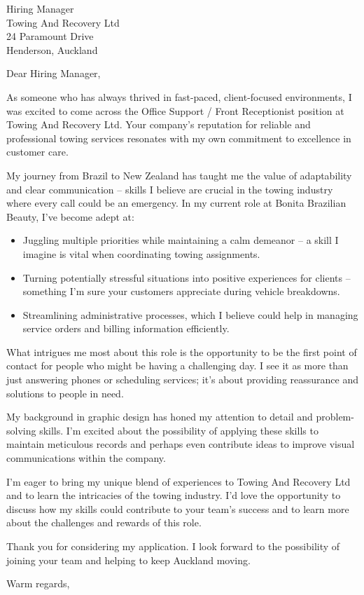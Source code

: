 \documentclass[11pt,a4paper]{letter}
\begin{document}
\begin{letter}{Hiring Manager\\ Towing And Recovery Ltd\\ 24 Paramount Drive\\ Henderson, Auckland}

\opening{Dear Hiring Manager,}

As someone who has always thrived in fast-paced, client-focused environments, I was excited to come across the Office Support / Front Receptionist position at Towing And Recovery Ltd. Your company's reputation for reliable and professional towing services resonates with my own commitment to excellence in customer care.

My journey from Brazil to New Zealand has taught me the value of adaptability and clear communication – skills I believe are crucial in the towing industry where every call could be an emergency. In my current role at Bonita Brazilian Beauty, I've become adept at:

\begin{itemize}
    \item Juggling multiple priorities while maintaining a calm demeanor – a skill I imagine is vital when coordinating towing assignments.
    \item Turning potentially stressful situations into positive experiences for clients – something I'm sure your customers appreciate during vehicle breakdowns.
    \item Streamlining administrative processes, which I believe could help in managing service orders and billing information efficiently.
\end{itemize}

What intrigues me most about this role is the opportunity to be the first point of contact for people who might be having a challenging day. I see it as more than just answering phones or scheduling services; it's about providing reassurance and solutions to people in need.

My background in graphic design has honed my attention to detail and problem-solving skills. I'm excited about the possibility of applying these skills to maintain meticulous records and perhaps even contribute ideas to improve visual communications within the company.

I'm eager to bring my unique blend of experiences to Towing And Recovery Ltd and to learn the intricacies of the towing industry. I'd love the opportunity to discuss how my skills could contribute to your team's success and to learn more about the challenges and rewards of this role.

Thank you for considering my application. I look forward to the possibility of joining your team and helping to keep Auckland moving.

\closing{Warm regards,}

\end{letter}
\end{document}
